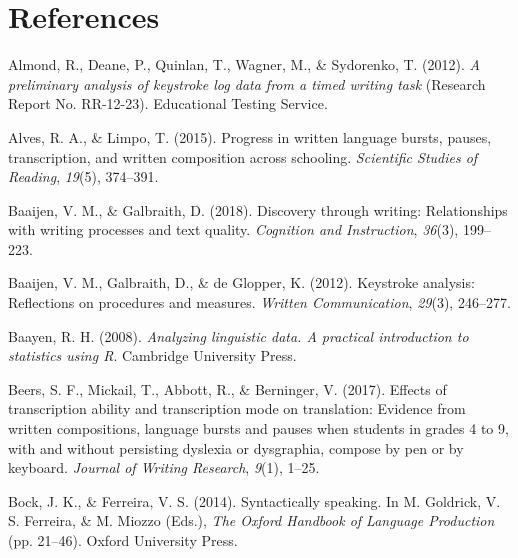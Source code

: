 \documentclass[
  english,
  man,mask,floatsintext]{apa7}
\newlength{\cslhangindent}
\newenvironment{cslreferences}%
  {\setlength{\parindent}{0pt}%
  \everypar{\setlength{\hangindent}{\cslhangindent}}\ignorespaces}%
  {\par}
\begin{document}
\hypertarget{references}{%
\section{References}\label{references}}

\begingroup
\setlength{\parindent}{-0.5in}
\setlength{\leftskip}{0.5in}

\hypertarget{ref}{}

\endgroup

\hypertarget{refs}{}
\begin{cslreferences}
\leavevmode\hypertarget{ref-almond2012preliminary}{}%
Almond, R., Deane, P., Quinlan, T., Wagner, M., \& Sydorenko, T. (2012). \emph{A preliminary analysis of keystroke log data from a timed writing task} (Research Report No. RR-12-23). Educational Testing Service.

\leavevmode\hypertarget{ref-alves2015progress}{}%
Alves, R. A., \& Limpo, T. (2015). Progress in written language bursts, pauses, transcription, and written composition across schooling. \emph{Scientific Studies of Reading}, \emph{19}(5), 374--391.

\leavevmode\hypertarget{ref-baaijen2018discovery}{}%
Baaijen, V. M., \& Galbraith, D. (2018). Discovery through writing: Relationships with writing processes and text quality. \emph{Cognition and Instruction}, \emph{36}(3), 199--223.

\leavevmode\hypertarget{ref-baaijen2012keystroke}{}%
Baaijen, V. M., Galbraith, D., \& de Glopper, K. (2012). Keystroke analysis: Reflections on procedures and measures. \emph{Written Communication}, \emph{29}(3), 246--277.

\leavevmode\hypertarget{ref-baa08book}{}%
Baayen, R. H. (2008). \emph{Analyzing linguistic data. A practical introduction to statistics using R}. Cambridge University Press.

\leavevmode\hypertarget{ref-beers2017effects}{}%
Beers, S. F., Mickail, T., Abbott, R., \& Berninger, V. (2017). Effects of transcription ability and transcription mode on translation: Evidence from written compositions, language bursts and pauses when students in grades 4 to 9, with and without persisting dyslexia or dysgraphia, compose by pen or by keyboard. \emph{Journal of Writing Research}, \emph{9}(1), 1--25.

\leavevmode\hypertarget{ref-bock2014syntactically}{}%
Bock, J. K., \& Ferreira, V. S. (2014). Syntactically speaking. In M. Goldrick, V. S. Ferreira, \& M. Miozzo (Eds.), \emph{The Oxford Handbook of Language Production} (pp. 21--46). Oxford University Press.


\end{cslreferences}
\end{document}
